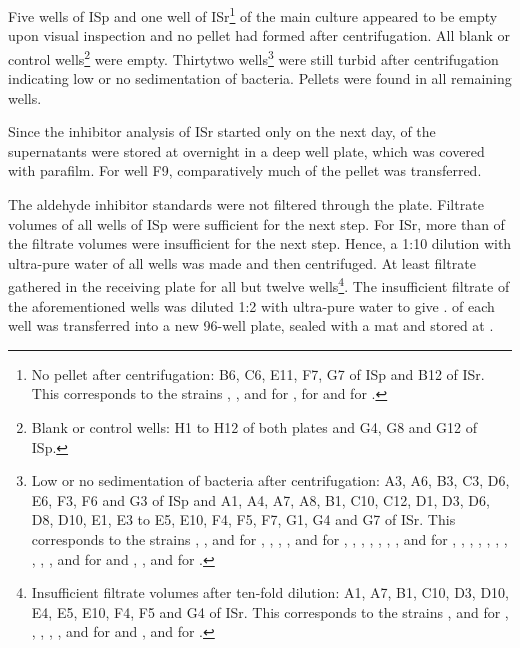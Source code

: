 \label{intext-inh-hcs-controls-nopellet}Five wells of ISp and one well of ISr\footnote{No pellet after centrifugation: B6, C6, E11, F7, G7 of ISp and B12 of ISr. This corresponds to the strains , ,  and  for \fur{},  for \van{} and  for \laev{}.} of the main culture appeared to be empty upon visual inspection and no pellet had formed after centrifugation. All blank or control wells\footnote{Blank or control wells: H1 to H12 of both plates and G4, G8 and G12 of ISp.} were empty. Thirtytwo wells\footnote{Low or no sedimentation of bacteria after centrifugation: A3, A6, B3, C3, D6, E6, F3, F6 and G3 of ISp and A1, A4, A7, A8, B1, C10, C12, D1, D3, D6, D8, D10, E1, E3 to E5, E10, F4, F5, F7, G1, G4 and G7 of ISr. This corresponds to the strains , ,  and  for \fur{}, , , ,  and  for \hmf{}, , , , , , ,  and  for \acet{}, , , , , , , , , ,  and  for \fora{} and , ,  and  for \laev{}.} were still turbid after centrifugation indicating low or no sedimentation of bacteria. Pellets were found in all remaining wells.

Since the inhibitor analysis of ISr started only on the next day,  of the supernatants were stored at  overnight in a deep well plate, which was covered with parafilm. For well F9, comparatively much of the pellet was transferred.

The aldehyde inhibitor standards were not filtered through the  plate. Filtrate volumes of all wells of ISp were sufficient for the next step. For ISr, more than  of the filtrate volumes were insufficient for the next step. Hence, a 1:10 dilution with ultra-pure water of all wells was made and then centrifuged. At least  filtrate gathered in the receiving plate for all but twelve wells\footnote{Insufficient filtrate volumes after ten-fold dilution: A1, A7, B1, C10, D3, D10, E4, E5, E10, F4, F5 and G4 of ISr. This corresponds to the strains ,  and  for \acet{}, , , , ,  and  for \fora{} and ,  and  for \laev{}.}. The insufficient filtrate of the aforementioned wells was diluted 1:2 with ultra-pure water to give .  of each well was transferred into a new 96-well plate, sealed with a mat and stored at .

